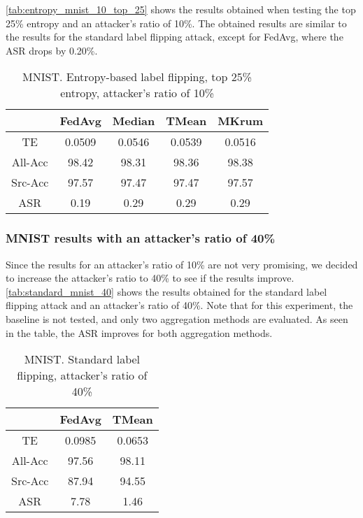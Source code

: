 \autoref{tab:entropy_mnist_10_top_25} shows the results obtained when testing the top 25\% entropy and an attacker's ratio of 10\%.
The obtained results are similar to the results for the standard label flipping attack, except for FedAvg, where the ASR drops by 0.20\%.
\begin{table}[h!]
        \centering
        \begin{tabular}{|c|c|c|c|c|}
            \hline
            & FedAvg & Median & TMean & MKrum \\
            \hline
            TE & 0.0509 & 0.0546 & 0.0539 & 0.0516 \\
            \hline
            All-Acc & 98.42 & 98.31 & 98.36 & 98.38 \\
            \hline
            Src-Acc & 97.57 & 97.47 & 97.47 & 97.57 \\
            \hline
            ASR & 0.19 & 0.29 & 0.29 & 0.29 \\
            \hline
        \end{tabular}
        \caption{MNIST. Entropy-based label flipping, top 25\% entropy, attacker's ratio of 10\%}
        \label{tab:entropy_mnist_10_top_25}
    \end{table}

\subsubsection{MNIST results with an attacker's ratio of 40\%}

Since the results for an attacker's ratio of 10\% are not very promising, we decided to increase the attacker's ratio to 40\% to see if the results improve.
\autoref{tab:standard_mnist_40} shows the results obtained for the standard label flipping attack and an attacker's ratio of 40\%. Note that for this experiment, the baseline is not tested, and only two aggregation methods are evaluated.
As seen in the table, the ASR improves for both aggregation methods.
\begin{table}[h!]
        \centering
        \begin{tabular}{|c|c|c|}
            \hline
            & FedAvg & TMean \\
            \hline
            TE & 0.0985 & 0.0653 \\
            \hline
            All-Acc & 97.56 & 98.11 \\
            \hline
            Src-Acc & 87.94 & 94.55 \\
            \hline
            ASR & 7.78 & 1.46 \\
            \hline
        \end{tabular}
        \caption{MNIST. Standard label flipping, attacker's ratio of 40\%}
        \label{tab:standard_mnist_40}
    \end{table}
    
